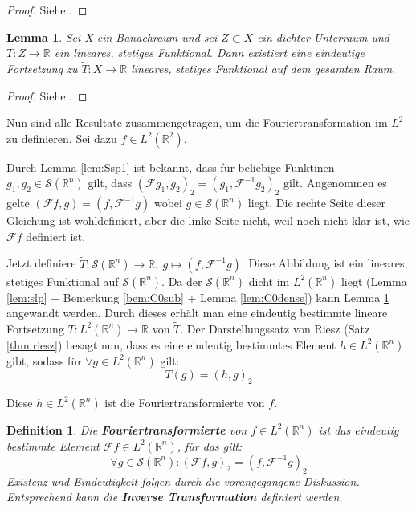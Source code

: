 \documentclass{article}
\newcommand{\R}[0]{\mathbb{R}}
\newcommand{\F}[0]{\mathcal{F}}
\newcommand{\Ssp}[0]{\mathcal{S}}
\newtheorem{defin}{Definition}
\newtheorem{lemma}{Lemma}
\begin{document}
\begin{proof}
    Siehe \cite[S. 171, Satz 4.1]{alt2016linear}.
\end{proof}

\begin{lemma}\label{lem:Text}
    Sei X ein Banachraum und sei $Z \subset X$ ein dichter Unterraum und $T: Z \to \R$ ein lineares, stetiges Funktional. Dann existiert eine eindeutige Fortsetzung zu $\tilde{T}: X \to \R$ lineares, stetiges Funktional auf dem gesamten Raum.
\end{lemma}

\begin{proof}
    Siehe \cite[S. 168, U 3.3]{alt2016linear}.
\end{proof}

Nun sind alle Resultate zusammengetragen, um die Fouriertransformation im $L^2$ zu definieren. Sei dazu $f \in L^2(\R^2)$.

Durch Lemma \ref{lem:Ssp1} ist bekannt, dass für beliebige Funktinen $g_1, g_2 \in \Ssp(\R^n)$ gilt, dass $(\F g_1, g_2)_2 = (g_1, \F^{-1}g_2)_2$ gilt.
Angenommen es gelte $(\F f, g) = (f, \F^{-1}g)$ wobei $g \in \Ssp(\R^n)$ liegt. Die rechte Seite dieser Gleichung ist wohldefiniert, aber die linke Seite nicht, weil noch nicht klar ist, wie $\F f$ definiert ist.

Jetzt definiere $\tilde{T}: \Ssp(\R^n) \to \R, \: g \mapsto (f, \F^{-1}g)$. Diese Abbildung ist ein lineares, stetiges Funktional auf $\Ssp(\R^n)$. 
Da der $\Ssp(\R^n)$ dicht im $L^2(\R^n)$ liegt (Lemma \ref{lem:slp} + Bemerkung \ref{bem:C0sub} + Lemma \ref{lem:C0dense}) kann Lemma \ref{lem:Text} angewandt werden.
Durch dieses erhält man eine eindeutig bestimmte lineare Fortsetzung $T: L^2(\R^n) \to \R$ von $\tilde{T}$. 
Der Darstellungssatz von Riesz (Satz \ref{thm:riesz}) besagt nun, dass es eine eindeutig bestimmtes Element $h \in L^2(\R^n)$ gibt, sodass für $\forall g \in L^2(\R^n)$ gilt:
\begin{equation}
    T(g) = (h, g)_2
\end{equation}

Diese $h \in L^2(\R^n)$ ist die Fouriertransformierte von $f$. \cite[S. 428f.]{ebert2018methods}

\begin{defin}
    Die \textbf{Fouriertransformierte} von $f \in L^2(\R^n)$ ist das eindeutig bestimmte Element $\F f \in L^2(\R^n)$, für das gilt:
    \begin{equation}
        \forall g \in \Ssp(\R^n): (\F f, g)_2 = (f, \F^{-1}g)_2
    \end{equation}
    Existenz und Eindeutigkeit folgen durch die vorangegangene Diskussion.
    Entsprechend kann die \textbf{Inverse Transformation} definiert werden.
\end{defin}
\end{document}
